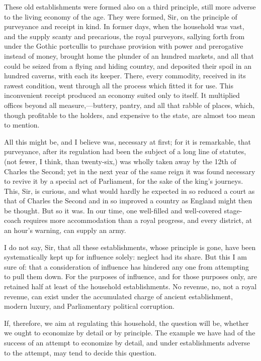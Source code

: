 These old establishments were formed also on a third principle, still more adverse to the living economy of the age. They were formed, Sir, on the principle of purveyance and receipt in kind. In former days, when the household was vast, and the supply scanty and precarious, the royal purveyors, sallying forth from under the Gothic portcullis to purchase provision with power and prerogative instead of money, brought home the plunder of an hundred markets, and all that could be seized from a flying and hiding country, and deposited their spoil in an hundred caverns, with each its keeper. There, every commodity, received in its rawest condition, went through all the process which fitted it for use. This inconvenient receipt produced an economy suited only to itself. It multiplied offices beyond all measure,—buttery, pantry, and all that rabble of places, which, though profitable to the holders, and expensive to the state, are almost too mean to mention.

All this might be, and I believe was, necessary at first; for it is remarkable, that purveyance, after its regulation had been the subject of a long line of statutes, (not fewer, I think, than twenty-six,) was wholly taken away by the 12th of Charles the Second; yet in the next year of the same reign it was found necessary to revive it by a special act of Parliament, for the sake of the king's journeys. This, Sir, is curious, and what would hardly he expected in so reduced a court as that of Charles the Second and in so improved a country as England might then be thought. But so it was. In our time, one well-filled and well-covered stage-coach requires more accommodation than a royal progress, and every district, at an hour's warning, can supply an army.

I do not say, Sir, that all these establishments, whose principle is gone, have been systematically kept up for influence solely: neglect had its share. But this I am sure of: that a consideration of influence has hindered any one from attempting to pull them down. For the purposes of influence, and for those purposes only, are retained half at least of the household establishments. No revenue, no, not a royal revenue, can exist under the accumulated charge of ancient establishment, modern luxury, and Parliamentary political corruption.

If, therefore, we aim at regulating this household, the question will be, whether we ought to economize by detail or by principle. The example we have had of the success of an attempt to economize by detail, and under establishments adverse to the attempt, may tend to decide this question.

